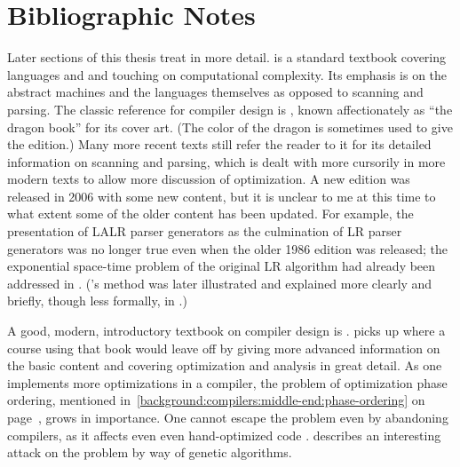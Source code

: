 \section{Bibliographic Notes}\label{imperative:conclusion:notes}
Later sections of this thesis treat \lambdacalc in more detail. %
 is a standard textbook covering languages and \TMs and touching on computational complexity. Its emphasis is on the abstract machines and the languages themselves as opposed to scanning and parsing. The classic reference for compiler design is \citet{Aho:Compilers:2006}, known affectionately as ``the dragon book'' for its cover art. (The color of the dragon is sometimes used to give the edition.) Many more recent texts still refer the reader to it for its detailed information on scanning and parsing, which is dealt with more cursorily in more modern texts to allow more discussion of optimization. A new edition was released in 2006 with some new content, but it is unclear to me at this time to what extent some of the older content has been updated. For example, the presentation of LALR parser generators as the culmination of LR parser generators was no longer true even when the older 1986 edition was released; the exponential space-time problem of the original LR algorithm had already been addressed in \citet{Pager:The-lane:1973}. ('s method was later illustrated and explained more clearly and briefly, though less formally, in \citet{Spector:Efficient:1988}.)

A good, modern, introductory textbook on compiler design is \citet{Cooper:Engineering:2004}.  picks up where a course using that book would leave off by giving more advanced information on the basic content and covering optimization and analysis in great detail. As one implements more optimizations in a compiler, the problem of optimization phase ordering, mentioned in~\ref{background:compilers:middle-end:phase-ordering} on page~\pageref{background:compilers:middle-end:phase-ordering}, grows in importance. One cannot escape the problem even by abandoning compilers, as it affects even even hand-optimized code \citep{Hines:Using:2005}.  describes an interesting attack on the problem by way of genetic algorithms.

